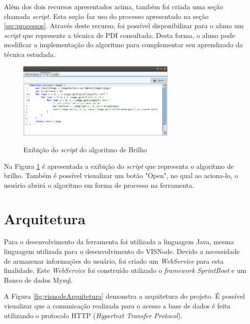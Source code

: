 \documentclass[
	12pt,				%
	oneside,			%
	a4paper,			%
	english,			%
	french,				%
	spanish,			%
	brazil,				%
	]{abntex2}
\begin{document}
Além dos dois recursos apresentados acima, também foi criada uma seção chamada \textit{script}. Esta seção faz uso do processo apresentado na seção \ref{sec:processos}. Através deste recurso, foi possível disponibilizar para o aluno um \textit{script} que represente a técnica de PDI consultada. Desta forma, o aluno pode modificar a implementação do algoritmo para complementar seu aprendizado da técnica estudada.

\begin{figure}[ht]
\centering
\caption{Exibição do \textit{script} do algoritmo de Brilho}
\includegraphics[width=0.7\textwidth]{imagens/visnode_script.png}
\sourceAuthor
\label{fig:visnodeScript}
\end{figure}

Na Figura \ref{fig:visnodeScript} é apresentada a exibição do \textit{script} que representa o algoritmo de brilho. Também é possível visualizar um botão "Open", no qual ao aciona-lo, o usuário abrirá o algoritmo em forma de processo na ferramenta.

\section{Arquitetura}

Para o desenvolvimento da ferramenta foi utilizada a linguagem Java, mesma linguagem utilizada para o desenvolvimento do VISNode. Devido a necessidade de armazenar informações do usuário, foi criado um \textit{WebService} para esta finalidade. Este \textit{WebService} foi construído utilizado o \textit{framework} \textit{SprintBoot} e um Banco de dados Mysql.

A Figura \ref{fig:visnodeArquitetura} demonstra a arquitetura do projeto. É possível visualizar que a comunicação realizada para o acesso a base de dados é feita utilizando o protocolo HTTP (\textit{Hypertext Transfer Protocol}). 
\end{document}
